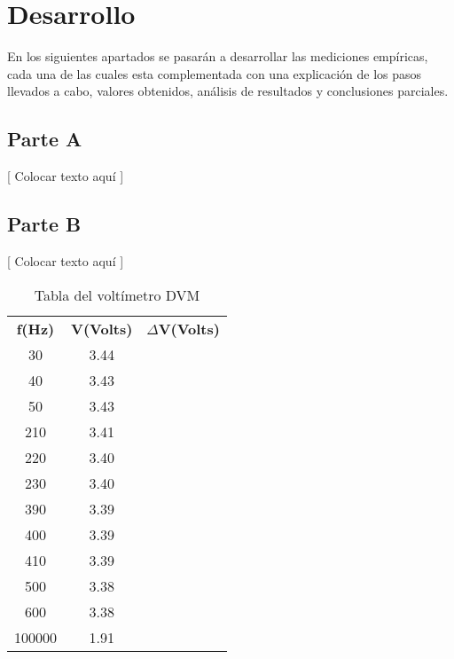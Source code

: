 \documentclass{article}
\begin{document}
\section{Desarrollo}

	En los siguientes apartados se pasarán a desarrollar las mediciones empíricas, cada una de las cuales esta complementada con una explicación de los pasos llevados a cabo, valores obtenidos, análisis de resultados y conclusiones parciales.
\bigskip



\subsection{Parte A}

	[ Colocar texto aquí ]




\subsection{Parte B}

	[ Colocar texto aquí ]


\begin{table}[!hbt]
	\begin{center}
	\begin{tabular}{|c|c|c|}\hline
	\textbf{f(Hz)} & \textbf{V(Volts)} & \textbf{$\Delta$V(Volts)} \\

	30 & 3.44 &	\\ \hline
    40 & 3.43 &	\\ \hline
    50 & 3.43&	\\ \hline
	210 & 3.41&	\\ \hline
	220 & 3.40&	\\ \hline
	230 & 3.40&	\\ \hline
	390 & 3.39&	\\ \hline
	400 & 3.39&	\\ \hline
	410 & 3.39&	\\	 \hline
	500 & 3.38&	\\ \hline
	600 & 3.38&	\\ \hline
	100000 & 1.91&	\\ \hline
	\end{tabular}
	\caption{Tabla del voltímetro DVM}
	\end{center}
\end{table}
\end{document}
